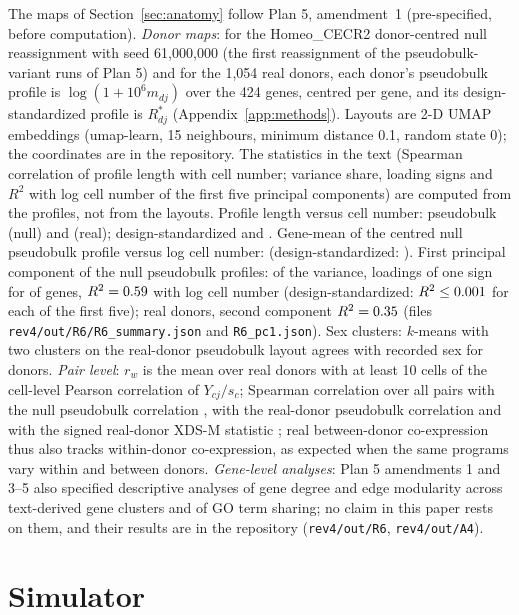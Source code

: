The maps of Section~\ref{sec:anatomy} follow Plan 5, amendment~1 (pre-specified, before computation). \emph{Donor maps}: for the Homeo\_CECR2 donor-centred null reassignment with seed 61{,}000{,}000 (the first reassignment of the pseudobulk-variant runs of Plan 5) and for the 1{,}054 real donors, each donor's pseudobulk profile is $\log(1+10^6m_{dj})$ over the 424 genes, centred per gene, and its design-standardized profile is $R^*_{dj}$ (Appendix~\ref{app:methods}). Layouts are 2-D UMAP embeddings \citep{McInnes2018UMAP} (umap-learn, 15 neighbours, minimum distance 0.1, random state 0); the coordinates are in the repository. The statistics in the text (Spearman correlation of profile length with cell number; variance share, loading signs and $R^2$ with log cell number of the first five principal components) are computed from the profiles, not from the layouts. Profile length versus cell number: pseudobulk \RsixNormPB{} (null) and \RsixRealNormPB{} (real); design-standardized \RsixNormR{} and \RsixRealNormR. Gene-mean of the centred null pseudobulk profile versus log cell number: \RsixRowMeanLogn{} (design-standardized: \RsixRowMeanLognR). First principal component of the null pseudobulk profiles: \RsixPConeVar{} of the variance, loadings of one sign for \RsixPConeSign{} of genes, $R^2=0.59$ with log cell number (design-standardized: $R^2\le0.001$ for each of the first five); real donors, second component $R^2=0.35$ (files \texttt{rev4/out/R6/R6\_summary.json} and \texttt{R6\_pc1.json}). Sex clusters: $k$-means with two clusters on the real-donor pseudobulk layout agrees with recorded sex for \RsixSexConc{} donors. \emph{Pair level}: $r_w$ is the mean over real donors with at least 10 cells of the cell-level Pearson correlation of $Y_{cj}/s_c$; Spearman correlation over all \RsixPairs{} pairs with the null pseudobulk correlation \RsixPairNull, with the real-donor pseudobulk correlation \RsixPairRealPB{} and with the signed real-donor XDS-M statistic \RsixPairRealX{}; real between-donor co-expression thus also tracks within-donor co-expression, as expected when the same programs vary within and between donors. \emph{Gene-level analyses}: Plan 5 amendments 1 and 3--5 also specified descriptive analyses of gene degree and edge modularity across text-derived gene clusters and of GO term sharing; no claim in this paper rests on them, and their results are in the repository (\texttt{rev4/out/R6}, \texttt{rev4/out/A4}).

\section{Simulator}\label{app:sim}

